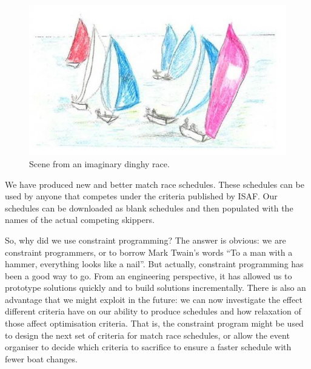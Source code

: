 \documentclass{llncs}
\begin{document}
\begin{figure}[tb]
    \centering
    \includegraphics[keepaspectratio=true,width=4.6in]{dinghy.jpg}
\caption{Scene from an imaginary dinghy race.}
\label{dinghy}
\end{figure}

We have produced new and better match race schedules. These schedules can be used by anyone that
competes under the criteria published by ISAF. Our schedules can be downloaded as blank schedules
and then populated with the names of the actual competing skippers.

So, why did we use constraint programming? The answer is obvious:  we are constraint programmers, or
to borrow Mark Twain's words ``To a man with a hammer, everything looks like a nail''. But actually,
constraint programming has been a good way to go. From an engineering perspective, it has allowed us
to prototype solutions quickly and to build solutions incrementally. There is also an advantage that
we might exploit in the future: we can now investigate the effect different criteria have on our
ability to produce schedules and how relaxation of those affect optimisation criteria. That is, the
constraint program might be used to design the next set of criteria for match race schedules, or
allow the event organiser to decide which criteria to sacrifice to ensure a faster schedule with
fewer boat changes.



\end{document}
